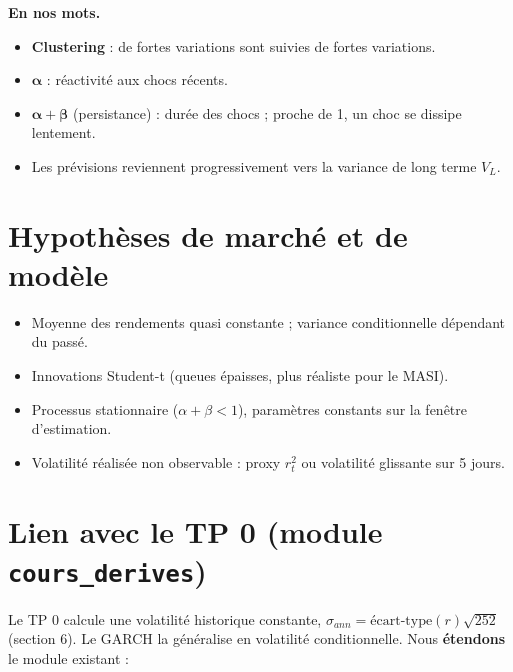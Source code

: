 \documentclass[10pt,a4paper]{article}
\begin{document}
\medskip
\textbf{En nos mots.}
\begin{itemize}
  \item \textbf{Clustering} : de fortes variations sont suivies de fortes variations.
  \item $\boldsymbol{\alpha}$ : réactivité aux chocs récents.
  \item $\boldsymbol{\alpha+\beta}$ (persistance) : durée des chocs ; proche de 1, un choc se dissipe lentement.
  \item Les prévisions reviennent progressivement vers la variance de long terme $V_L$.
\end{itemize}

\section{Hypothèses de marché et de modèle}
\begin{itemize}
  \item Moyenne des rendements quasi constante ; variance conditionnelle dépendant du passé.
  \item Innovations Student-t (queues épaisses, plus réaliste pour le MASI).
  \item Processus stationnaire ($\alpha+\beta<1$), paramètres constants sur la fenêtre d'estimation.
  \item Volatilité réalisée non observable : proxy $r_t^2$ ou volatilité glissante sur 5 jours.
\end{itemize}

\section{Lien avec le TP 0 (module \texttt{cours\_derives})}
Le TP 0 calcule une volatilité historique constante, $\sigma_{ann}=\text{écart-type}(r)\sqrt{252}$
(section 6). Le GARCH la généralise en volatilité conditionnelle. Nous \textbf{étendons} le module existant :
\end{document}
